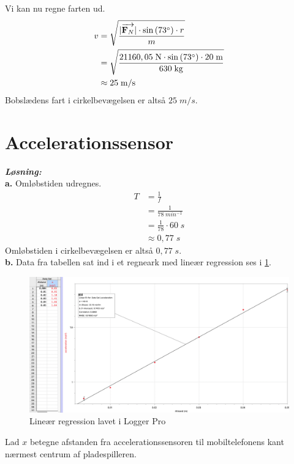 \documentclass{report}
\newcommand{\sol}{\setlength{\parindent}{0cm}\textbf{\textit{Løsning:}}\setlength{\parindent}{1cm}}
\begin{document}
Vi kan nu regne farten ud.
\begin{equation*}
\begin{split}
  v&=\sqrt{\frac{|\overrightarrow{\textbf{F}_N}| \cdot \sin\left(73 \degree \right) \cdot r}{m}} \\
  &=\sqrt{\frac{21160,05 \;\unit{N} \cdot \sin\left(73 \degree \right) \cdot 20 \;\unit{m} }{630 \;\unit{kg} }} \\
  &\approx 25 \;\unit{m/s} 
\end{split}
\end{equation*}
Bobslædens fart i cirkelbevægelsen er altså $25 \;\unit{m/s} $.
\section*{Accelerationssensor}
\sol \\
\textbf{a.}
Omløbstiden udregnes.
\begin{equation*}
\begin{split}
  T&=\frac{1}{f}\\
  &=\frac{1}{78 \;\unit{min^{-1}} }\\
  &=\frac{1}{78} \cdot 60\;\unit{s} \\
  &\approx 0,77 \;\unit{s} 
\end{split}
\end{equation*}
Omløbstiden i cirkelbevægelsen er altså $0,77 \;\unit{s} $.\\[1ex]
\textbf{b.}
Data fra tabellen sat ind i et regneark med lineær regression ses i \cref{fig:plade}.
\begin{figure}[H]
\begin{center}
  \includegraphics[scale=0.3]{plade.png}
\end{center}
\caption{Lineær regression lavet i Logger Pro}
\label{fig:plade}
\end{figure}
Lad $x$ betegne afstanden fra accelerationssensoren til mobiltelefonens kant nærmest centrum af pladespilleren.
\end{document}
